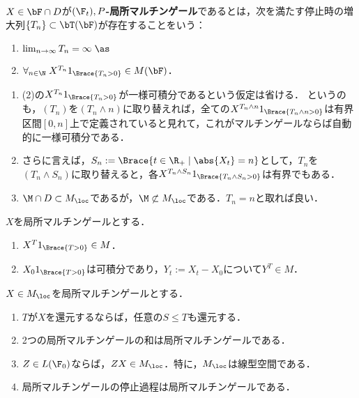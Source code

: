 \documentclass[uplatex,dvipdfmx]{jsreport}
\begin{document}
\begin{definition}
    $X\in\bF\cap D$が\textbf{$(\F_t),P$-局所マルチンゲール}であるとは，次を満たす停止時の増大列$\{T_n\}\subset\bT(\bF)$が存在することをいう：
    \begin{enumerate}
        \item $\lim_{n\to\infty}T_n=\infty\;\as$
        \item $\forall_{n\in\N}\;X^{T_n}1_{\Brace{T_n>0}}\in M(\bF)$．
    \end{enumerate}
\end{definition}
\begin{remarks}\mbox{}
    \begin{enumerate}
        \item (2)の$X^{T_n}1_{\Brace{T_n>0}}$が一様可積分であるという仮定は省ける．
        というのも，$(T_n)$を$(T_n\land n)$に取り替えれば，全ての$X^{T_n\land n}1_{\Brace{T_n\land n>0}}$は有界区間$[0,n]$上で定義されていると見れて，これがマルチンゲールならば自動的に一様可積分である．
        \item さらに言えば，$S_n:=\Brace{t\in\R_+\mid\abs{X_t}=n}$として，$T_n$を$(T_n\land S_n)$に取り替えると，各$X^{T_n\land S_n}1_{\Brace{T_n\land S_n>0}}$は有界でもある．
        \item $\M\cap D\subset M_\loc$であるが，$\M\not\subset M_\loc$である．$T_n=n$と取れば良い．
    \end{enumerate}
\end{remarks}

\begin{proposition}[マルチンゲールに還元する停止時について]
    $X$を局所マルチンゲールとする．
    \begin{enumerate}
        \item $X^T1_{\Brace{T>0}}\in M$．
        \item $X_01_{\Brace{T>0}}$は可積分であり，$Y_t:=X_t-X_0$について$Y^T\in M$．
    \end{enumerate}
\end{proposition}

\begin{corollary}[局所マルチンゲールの構成]
    $X\in M_\loc$を局所マルチンゲールとする．
    \begin{enumerate}
        \item $T$が$X$を還元するならば，任意の$S\le T$も還元する．
        \item 2つの局所マルチンゲールの和は局所マルチンゲールである．
        \item $Z\in L(\F_0)$ならば，$ZX\in M_\loc$．特に，$M_\loc$は線型空間である．
        \item 局所マルチンゲールの停止過程は局所マルチンゲールである．
    \end{enumerate}
\end{corollary}
\end{document}
